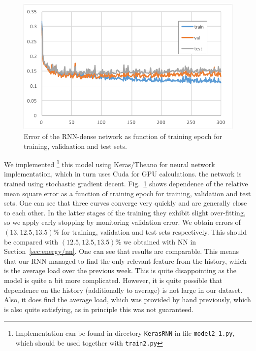 \documentclass{article} %
\begin{document}
\begin{figure}[h]
\begin{center}
\includegraphics[width=0.70\linewidth]{energy_RNN_learning.pdf}	
\end{center}
\caption{Error of the RNN-dense network as function of training epoch for 
training, validaation and test sets.}
\label{fig:energy/rnn_learn}
\end{figure}
We implemented%
\footnote{
Implementation can be found in directory {\tt KerasRNN} in 
file {\tt  model2\_1.py},
which should be used together with {\tt train2.py}
}
this model using Keras/Theano for neural network implementation, which in turn 
uses Cuda for GPU calculations. the network is trained using stochastic 
gradient decent.
Fig.~\ref{fig:energy/rnn_learn} shows dependence of the relative 
mean square error as a function of training epoch for training, validation 
and test sets. One can see that three curves converge very quickly and
are generally close to each other. In the latter stages of the training they
exhibit slight over-fitting, so we apply early stopping by monitoring
validation error. We obtain errors of $(13,12.5,13.5)\%$ for training,
validation and test sets respectively.
This should be compared with  $(12.5,12.5,13.5)\%$ we obtained
with NN in Section~\ref{sec:energy/nn}. One can see that results are comparable.
This means that our RNN managed to find the only relevant feature from the history,
which is the average load over the previous week.
This is quite disappointing as the model is quite a bit more complicated.
However, it is quite possible that dependence on the history 
(additionally to average) is not large in our dataset.
Also, it does find the average load, which was provided by hand previously,
which is also quite satisfying, as in principle this was not guaranteed.
\end{document}
